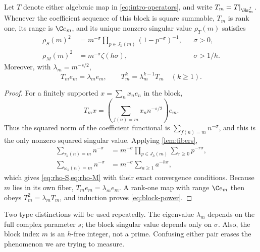 \begin{lemma}
\label{lem:block-ledger}
Let $T$ denote either algebraic map in \cref{eq:intro-operators}, and
write $T_m=T|_{\Hs_m^f}$.  Whenever the coefficient sequence of this block
is square summable, $T_m$ is rank one, its range is $\C e_m$, and its
unique nonzero singular value $\rho_T(m)$ satisfies
\begin{align}
  \rho_S(m)^2
    &=m^{-\sigma}\prod_{p\in J_h(m)}(1-p^{-\sigma})^{-1},
      &&\sigma>0,                                      \label{eq:rho-S}\\
  \rho_M(m)^2
    &=m^{-\sigma}\zeta(h\sigma),
      &&\sigma>1/h.                                    \label{eq:rho-M}
\end{align}
Moreover, with $\lambda_m=m^{-s/2}$,
\begin{equation}
  T_m e_m=\lambda_m e_m,
  \qquad
  T_m^k=\lambda_m^{k-1}T_m\quad(k\ge1).
  \label{eq:block-power}
\end{equation}
\end{lemma}

\begin{proof}
For a finitely supported $x=\sum_n x_ne_n$ in the block,
\[
  T_mx=\left(\sum_{f(n)=m}x_n n^{-s/2}\right)e_m.
\]
Thus the squared norm of the coefficient functional is
$\sum_{f(n)=m}n^{-\sigma}$, and this is the only nonzero squared singular
value.  Applying \cref{lem:fibers},
\begin{align*}
  \sum_{\tau_h(n)=m}n^{-\sigma}
    &=m^{-\sigma}\prod_{p\in J_h(m)}\sum_{r\ge0}p^{-r\sigma},\\
  \sum_{\omega_h(n)=m}n^{-\sigma}
    &=m^{-\sigma}\sum_{a\ge1}a^{-h\sigma},
\end{align*}
which gives \cref{eq:rho-S,eq:rho-M} with their exact convergence
conditions.  Because $m$ lies in its own fiber, $T_me_m=\lambda_me_m$.
A rank-one map with range $\C e_m$ then obeys
$T_m^2=\lambda_mT_m$, and induction proves \cref{eq:block-power}.
\end{proof}

Two type distinctions will be used repeatedly.  The eigenvalue
$\lambda_m$ depends on the full complex parameter $s$; the block singular
value depends only on $\sigma$.  Also, the block index $m$ is an $h$-free
integer, not a prime.  Confusing either pair erases the phenomenon we are
trying to measure.


